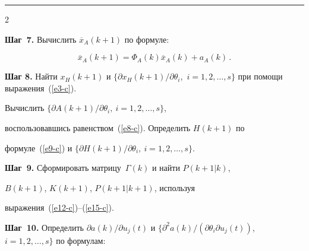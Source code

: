   


  \vspace*{6pt}


  


    \hrule


  


  \smallskip





  \begin{multicols}{2}


  


 





  \textbf{Шаг~7.} Вычислить $\overline{x}_A(k+1)$ по формуле:


  $$


  \overline{x}_A(k+1)=\Phi_A(k)\overline{x}_A(k)+a_A(k)\,.


  $$





\textbf{Шаг 8.} Найти $x_H(k+1)$ и $\{\partial x_H(k+1)/\partial\theta_i$,\ $i=1, 2, \ldots ,


s\}$ при помощи выражения~(\ref{e3-c}).


Вы\-чис\-лить $\{\partial A(k+1)/\partial\theta_i, \ i=1, 2, \ldots ,s\}$,


воспользовавшись равенством~(\ref{e8-c}). Определить $H(k+1)$ по


формуле~(\ref{e9-c}) и $\{\partial H(k+1)/\partial\theta_i,\ i=1, 2, \ldots , s\}$.





\smallskip


\textbf{Шаг~9.} Сформировать матрицу~$\Gamma(k)$ и найти $P(k+1\vert k)$,


$B(k+1)$, $K(k+1)$, $P(k+1\vert k+1)$, используя


  выражения~(\ref{e12-c})--(\ref{e15-c}).





\smallskip


\textbf{Шаг~10.} Определить $\partial a(k)/\partial u_j(t)$ и $\{\partial^2


a(k)/(\partial\theta_i \partial u_j(t))$, $i=1, 2, \ldots ,s\}$ по формулам:


  \begin{align*}



\end{align*}
\end{multicols}
